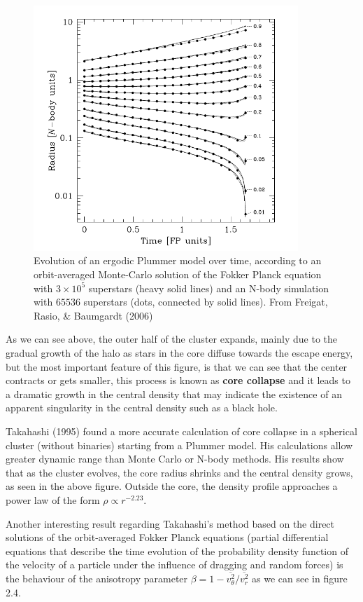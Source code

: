 \begin{figure}[H]
\centering
\includegraphics[width=10cm]{images/core_collapse.png}
\caption[Evolution of an ergodic Plummer model over time]{Evolution of an ergodic Plummer model over time, according to an orbit-averaged Monte-Carlo solution of the Fokker Planck equation with $3\times10^{5}$ superstars (heavy solid lines) and an N-body simulation with $65536$ superstars (dots, connected by solid lines). From Freigat, Rasio, \& Baumgardt (2006)}
\end{figure}

As we can see above, the outer half of the cluster expands, mainly due to the gradual growth of the halo as stars in the core diffuse towards the escape energy, but the most important feature of this figure, is that we can see that the center contracts or gets smaller, this process is known as \textbf{core collapse} and it leads to a dramatic growth in the central density that may indicate the existence of an apparent singularity in the central density such as a black hole.

Takahashi (1995) found a more accurate calculation of core collapse in a spherical cluster (without binaries) starting from a Plummer model. His calculations allow greater dynamic range than Monte Carlo or N-body methods. His results show that as the cluster evolves, the core radius shrinks  and the central density grows, as seen in the above figure. Outside the core, the density profile approaches a power law of the form $\rho\varpropto r^{-2.23}$.

Another interesting result regarding Takahashi's method based on the direct solutions of the orbit-averaged Fokker Planck equations (partial differential equations that describe the time evolution of the probability density function of the velocity of a particle under the influence of dragging and random forces) is the behaviour of the anisotropy parameter $\beta=1-\overline{v_{\theta}^{2}}/\overline{v_{r}^{2}}$ as we can see in figure 2.4.

